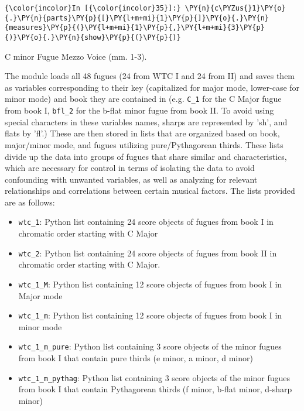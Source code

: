     \begin{Verbatim}[commandchars=\\\{\}]
{\color{incolor}In [{\color{incolor}35}]:} \PY{n}{c\PYZus{}1}\PY{o}{.}\PY{n}{parts}\PY{p}{[}\PY{l+m+mi}{1}\PY{p}{]}\PY{o}{.}\PY{n}{measures}\PY{p}{(}\PY{l+m+mi}{1}\PY{p}{,}\PY{l+m+mi}{3}\PY{p}{)}\PY{o}{.}\PY{n}{show}\PY{p}{(}\PY{p}{)}
\end{Verbatim}

\begin{Example}[H]
\vspace{1.5em}
    \centering
    \caption{ C minor Fugue Mezzo Voice (mm. 1-3). }
\end{Example}    
    The module loads all 48 fugues (24 from WTC I and 24 from II) and saves
them as variables corresponding to their key (capitalized for major
mode, lower-case for minor mode) and book they are contained in (e.g.
\texttt{C\_1} for the C Major fugue from book I, \texttt{bfl\_2} for the
b-flat minor fugue from book II. To avoid using special characters in
these variables names, sharps are represented by 'sh', and flats by
'fl'.) These are then stored in lists that are organized based on book,
major/minor mode, and fugues utilizing pure/Pythagorean thirds. These
lists divide up the data into groups of fugues that share similar and
characteristics, which are necessary for control in terms of isolating
the data to avoid confounding with unwanted variables, as well as
analyzing for relevant relationships and correlations between certain
musical factors. The lists provided are as follows:

\begin{itemize}
\tightlist
\item
  \texttt{wtc\_1}: Python list containing 24 score objects of fugues
  from book I in chromatic order starting with C Major
\item
  \texttt{wtc\_2}: Python list containing 24 score objects of fugues
  from book II in chromatic order starting with C Major.
\item
  \texttt{wtc\_1\_M}: Python list containing 12 score objects of fugues
  from book I in Major mode
\item
  \texttt{wtc\_1\_m}: Python list containing 12 score objects of fugues
  from book I in minor mode
\item
  \texttt{wtc\_1\_m\_pure}: Python list containing 3 score objects of
  the minor fugues from book I that contain pure thirds (e minor, a
  minor, d minor)
\item
  \texttt{wtc\_1\_m\_pythag}: Python list containing 3 score objects of
  the minor fugues from book I that contain Pythagorean thirds (f minor,
  b-flat minor, d-sharp minor)
\end{itemize}

